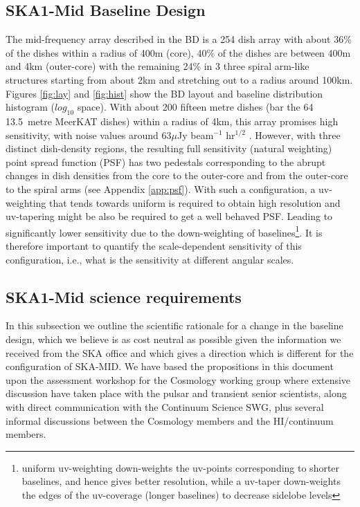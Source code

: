 \documentclass[sfheadings,a4paper,times,9pt,floats,floatfix]{article}
\begin{document}
\subsection{SKA1-Mid Baseline Design}\label{sec:BL}
The mid-frequency array described in the BD is a 254 dish array with about $36\%$ of the dishes within a radius of 400m (core),
40\% of the dishes are between 400m and 4km (outer-core) with the remaining 24\% in 3 three spiral arm-like structures starting
from about 2km and stretching out to a radius around 100km. Figures \ref{fig:lay} and \ref{fig:hist} show the BD layout and
baseline distribution histogram ($log_{10}$ space). With about 200 fifteen metre dishes (bar the 64 13.5~metre MeerKAT dishes)
within a radius of 4km, this array promises high sensitivity, with noise values around 63$\mu$Jy beam$^{-1}$ hr$^{1/2}$ \cite{bd}.
However, with three distinct dish-density regions, the resulting full sensitivity (natural weighting) point spread function (PSF)
has two pedestals corresponding to the abrupt changes in dish densities from the core to the outer-core and from the outer-core to
the spiral arms (see Appendix \ref{app:psf}). With such a configuration, a uv-weighting that tends towards uniform is required to
obtain high resolution and uv-tapering might be also be required to get a well behaved PSF. Leading to significantly lower
sensitivity due to the down-weighting of baselines\footnote{uniform uv-weighting down-weights the uv-points corresponding to
shorter baselines, and hence gives better resolution, while a uv-taper down-weights the edges of the uv-coverage (longer
baselines) to decrease sidelobe levels}. It is therefore important to quantify the scale-dependent sensitivity of this
configuration, i.e., what is the sensitivity at different angular scales.
\subsection{SKA1-Mid science requirements}\label{sec:sci-req}

In this subsection we outline the scientific rationale for a change in
the baseline design,
which we believe is as cost neutral as possible given the information we received from the
SKA office and which gives a direction which is different for the configuration of SKA-MID.
We have based the propositions in this document upon the assessment workshop for the
Cosmology working group where extensive discussion have taken place with the pulsar and
transient senior scientists, along with direct communication with the
Continuum Science SWG, plus several informal discussions between the Cosmology
members and the HI/continuum members.
\end{document}
